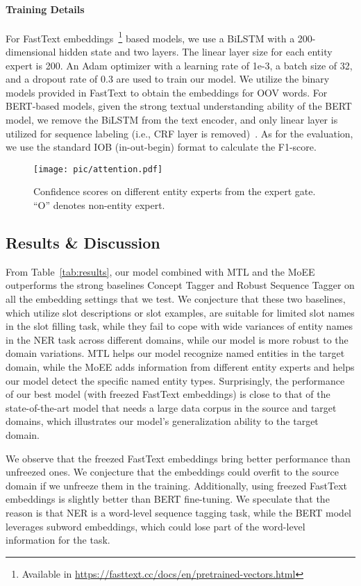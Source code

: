 \documentclass[11pt,a4paper]{article}
\begin{document}
\paragraph{Training Details}
For FastText embeddings~\footnote{Available in \url{https://fasttext.cc/docs/en/pretrained-vectors.html}} based models, we use a BiLSTM with a 200-dimensional hidden state and two layers. The linear layer size for each entity expert is 200. An Adam optimizer with a learning rate of 1e-3, a batch size of 32, and a dropout rate of 0.3 are used to train our model. We utilize the binary models provided in FastText to obtain the embeddings for OOV words.
For BERT-based models, given the strong textual understanding ability of the BERT model, we remove the BiLSTM from the text encoder, and only linear layer is utilized for sequence labeling (i.e., CRF layer is removed)~\cite{devlin2019bert}.
As for the evaluation, we use the standard IOB (in-out-begin) format to calculate the F1-score.

\begin{figure}[t!]
    \centering
    \texttt{[image: pic/attention.pdf]}
    \caption{Confidence scores on different entity experts from the expert gate. ``O'' denotes non-entity expert.}
    \label{fig:visual}
\end{figure}

\subsection{Results \& Discussion}
From Table~\ref{tab:results}, our model combined with MTL and the MoEE outperforms the strong baselines Concept Tagger and Robust Sequence Tagger on all the embedding settings that we test. We conjecture that these two baselines, which utilize slot descriptions or slot examples, are suitable for limited slot names in the slot filling task, while they fail to cope with wide variances of entity names in the NER task across different domains, while our model is more robust to the domain variations. MTL helps our model recognize named entities in the target domain, while the MoEE adds information from different entity experts and helps our model detect the specific named entity types. Surprisingly, the performance of our best model (with freezed FastText embeddings) is close to that of the state-of-the-art model that needs a large data corpus in the source and target domains, which illustrates our model's generalization ability to the target domain.

We observe that the freezed FastText embeddings bring better performance than unfreezed ones. We conjecture that the embeddings could overfit to the source domain if we unfreeze them in the training.
Additionally, using freezed FastText embeddings is slightly better than BERT fine-tuning. We speculate that the reason is that NER is a word-level sequence tagging task, while the BERT model leverages subword embeddings, which could lose part of the word-level information for the task.
\end{document}
